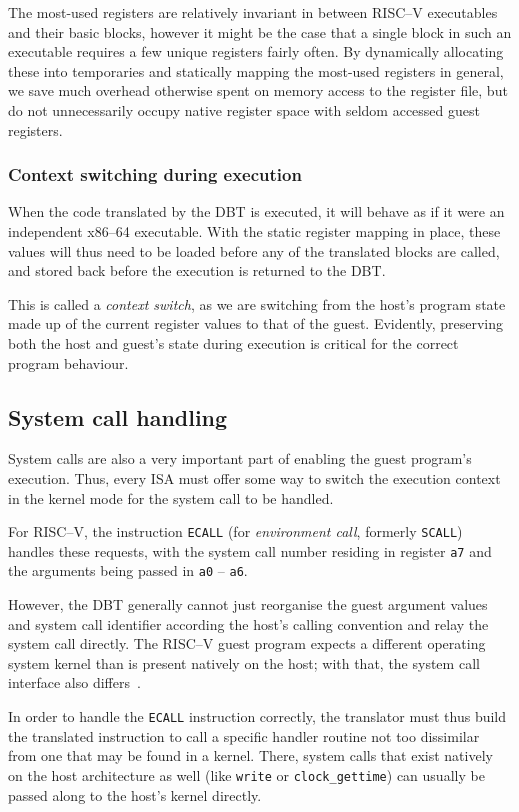 The most-used registers are relatively invariant in between RISC--V executables and their basic blocks, however it might be the case that a single block in such an executable requires a few unique registers fairly often.
By dynamically allocating these into temporaries and statically mapping the most-used registers in general, we save much overhead otherwise spent on memory access to the register file, but do not unnecessarily occupy native register space with seldom accessed guest registers.

\subsubsection{Context switching during execution}
When the code translated by the DBT is executed, it will behave as if it were an independent x86--64 executable.
With the static register mapping in place, these values will thus need to be loaded before any of the translated blocks are called, and stored back before the execution is returned to the DBT\@.

This is called a \textit{context switch}, as we are switching from the host's program state made up of the current register values to that of the guest.
Evidently, preserving both the host and guest's state during execution is critical for the correct program behaviour.

\subsection{System call handling}
\label{sec:syscall-handling}
System calls are also a very important part of enabling the guest program's execution.
Thus, every ISA must offer some way to switch the execution context in the kernel mode for the system call to be handled.

For RISC--V, the instruction \texttt{ECALL} (for \textit{environment call}, formerly \texttt{SCALL}) handles these requests, with the system call number residing in register \texttt{a7} and the arguments being passed in \texttt{a0} -- \texttt{a6}.

However, the DBT generally cannot just reorganise the guest argument values and system call identifier according the host's calling convention and relay the system call directly.
The RISC--V guest program expects a different operating system kernel than is present natively on the host;
with that, the system call interface also differs~\cite[S. 2f.]{bintrans}.

In order to handle the \texttt{ECALL} instruction correctly, the translator must thus build the translated instruction to call a specific handler routine not too dissimilar from one that may be found in a kernel.
There, system calls that exist natively on the host architecture as well (like \texttt{write} or \texttt{clock\_gettime}) can usually be passed along to the host's kernel directly.

